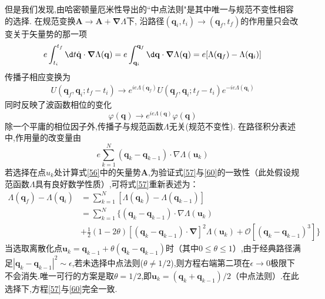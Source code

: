 但是我们发现,由哈密顿量厄米性导出的``中点法则"是其中唯一与规范不变性相容的选择. 在规范变换$\mathbf{A} \to \mathbf{A} + \boldsymbol{\nabla}\Lambda$下, 沿路径$(\mathbf{q}_i, t_i) \to (\mathbf{q}_f, t_f)$的作用量只会改变关于矢量势的那一项
\begin{equation}\label{57}
	e\int_{t_i}^{t_f}\d t\dot{\mathbf{q}}\cdot\boldsymbol{\nabla}\Lambda(\mathbf{q})=e\int_{\mathbf{q}_i}^{\mathbf{q}_f}\d\mathbf{q}\cdot\boldsymbol{\nabla}\Lambda(\mathbf{q})=e[\Lambda(\mathbf{q}_f)-\Lambda(\mathbf{q}_i)]
\end{equation}
传播子相应变换为
\begin{equation}
	\begin{aligned}U(\mathbf{q}_f,\mathbf{q}_i;t_f-t_i)\to e^{ie\Lambda(\mathbf{q}_f)}U(\mathbf{q}_f,\mathbf{q}_i;t_f-t_i)e^{-ie\Lambda(\mathbf{q}_i)}\end{aligned}
\end{equation}
同时反映了波函数相位的变化
\begin{equation}
	\varphi(\mathbf{q})\to e^{ie\Lambda(\mathbf{q})}\varphi(\mathbf{q})
\end{equation}
除一个平庸的相位因子外,传播子与规范函数$\Lambda$无关(规范不变性). 在路径积分表述中,作用量的改变量由
\begin{equation}\label{60}
	e\sum_{k=1}^N(\mathbf{q}_k-\mathbf{q}_{k-1})\cdot\nabla\Lambda(\mathbf{u}_k)
\end{equation}
若选择在点$u_k$处计算式\ref{56}中的矢量势$\mathbf{A}$,为验证式\ref{57}与\ref{60}的一致性（此处假设规范函数$\Lambda$具有良好数学性质）,可将式\ref{57}重新表述为：
\begin{equation}
	\begin{aligned}\Lambda(\mathbf{q}_f)-\Lambda(\mathbf{q}_i)&=\sum_{k=1}^N[\Lambda(\mathbf{q}_k)-\Lambda(\mathbf{q}_{k-1})]\\&=\sum_{k=1}^N\Big\{(\mathbf{q}_k-\mathbf{q}_{k-1})\cdot\nabla\Lambda(\mathbf{u}_k)\\&+\frac{1}{2}(1-2\theta)[(\mathbf{q}_k-\mathbf{q}_{k-1})\cdot\boldsymbol{\nabla}]^2\Lambda(\mathbf{u}_k)+\mathcal{O}[(\mathbf{q}_k-\mathbf{q}_{k-1})^3]\bigg\}\end{aligned}
\end{equation}
当选取离散化点$\mathbf{u}_k = \mathbf{q}_{k-1} + \theta(\mathbf{q}_k - \mathbf{q}_{k-1})$时（其中$0 \leq \theta \leq 1$）,由于经典路径满足$|\mathbf{q}_k - \mathbf{q}_{k-1}|^2 \sim \epsilon$,若未选择中点法则($\theta \neq 1/2$),则方程右端第二项在$\epsilon \to 0$极限下不会消失.唯一可行的方案是取$\theta = 1/2$,即$\mathbf{u}_k = (\mathbf{q}_k + \mathbf{q}_{k-1})/2$（中点法则）.在此选择下,方程\ref{57}与\ref{60}完全一致.

